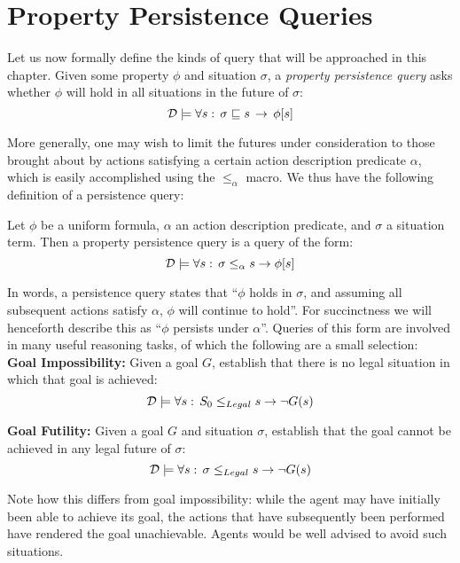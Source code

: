 \section{Property Persistence Queries\label{sec:Persistence:Definitions}}

Let us now formally define the kinds of query that will be approached
in this chapter. Given some property $\phi$ and situation $\sigma$,
a \emph{property persistence query} asks whether $\phi$ will hold
in all situations in the future of $\sigma$: \[
\mathcal{D}\models\forall s:\,\sigma\sqsubseteq s\,\rightarrow\,\phi[s]\]


More generally, one may wish to limit the futures under consideration
to those brought about by actions satisfying a certain action description
predicate $\alpha$, which is easily accomplished using the $\leq_{\alpha}$
macro. We thus have the following definition of a persistence query:

\begin{defnL}
 Let $\phi$ be a uniform
formula, $\alpha$ an action description predicate, and $\sigma$
a situation term. Then a property persistence query is a query of
the form:\[
\mathcal{D}\models\forall s:\,\sigma\le_{\alpha}s\rightarrow\phi[s]\]

\end{defnL}
In words, a persistence query states that {}``$\phi$ holds in $\sigma$,
and assuming all subsequent actions satisfy $\alpha$, $\phi$ will
continue to hold''. For succinctness we will henceforth describe
this as {}``$\phi$ persists under $\alpha$''. Queries of this
form are involved in many useful reasoning tasks, of which the following
are a small selection:\\


\textbf{Goal Impossibility:} Given a goal $G$, establish that there
is no legal situation in which that goal is achieved:\[
\mathcal{D}\models\forall s:\, S_{0}\leq_{Legal}s\rightarrow\neg G(s)\]


\textbf{Goal Futility:} Given a goal $G$ and situation $\sigma$,
establish that the goal cannot be achieved in any legal future of
$\sigma$:\[
\mathcal{D}\models\forall s:\,\sigma\leq_{Legal}s\rightarrow\neg G(s)\]


Note how this differs from goal impossibility: while the agent may
have initially been able to achieve its goal, the actions that have
subsequently been performed have rendered the goal unachievable. Agents
would be well advised to avoid such situations.\\


